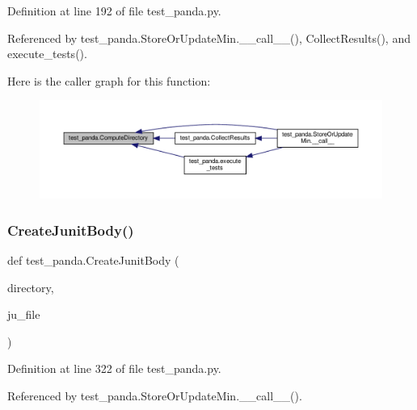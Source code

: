 Definition at line 192 of file test\+\_\+panda.\+py.



Referenced by test\+\_\+panda.\+Store\+Or\+Update\+Min.\+\_\+\+\_\+call\+\_\+\+\_\+(), Collect\+Results(), and execute\+\_\+tests().

Here is the caller graph for this function\+:
\nopagebreak
\begin{figure}[H]
\begin{center}
\leavevmode
\includegraphics[width=350pt]{d0/dee/namespacetest__panda_aecad727491366ab009da0c1bc773571e_icgraph}
\end{center}
\end{figure}
\mbox{\label{namespacetest__panda_a6844f5381f9afc285b33efc892f3befb}} 
\subsubsection{\texorpdfstring{Create\+Junit\+Body()}{CreateJunitBody()}}
{\footnotesize\ttfamily def test\+\_\+panda.\+Create\+Junit\+Body (\begin{DoxyParamCaption}\item[{}]{directory,  }\item[{}]{ju\+\_\+file }\end{DoxyParamCaption})}



Definition at line 322 of file test\+\_\+panda.\+py.



Referenced by test\+\_\+panda.\+Store\+Or\+Update\+Min.\+\_\+\+\_\+call\+\_\+\+\_\+().

